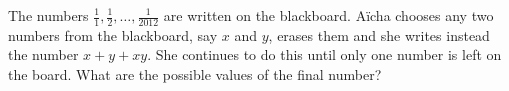 \documentclass[varwidth]{standalone}
\begin{document}
    The numbers $\frac{1}{1}, \frac{1}{2}, \dots, \frac{1}{2012}$ are written on the blackboard. A\"icha chooses any two numbers from the blackboard, say $x$ and $y$, erases them and she writes instead the number $x + y + xy$. She continues to do this until only one number is left on the board. What are the possible values of the final number?
\end{document}
